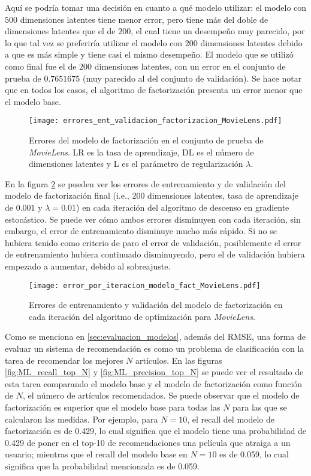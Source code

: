 Aquí se podría tomar una decisión en cuanto a qué modelo utilizar: el modelo con $500$ dimensiones latentes tiene menor error, pero tiene más del doble de dimensiones latentes que el de $200$, el cual tiene un desempeño muy parecido, por lo que tal vez se preferiría utilizar el modelo con $200$ dimensiones latentes debido a que es más simple y tiene casi el mismo desempeño. El modelo que se utilizó como final fue el de $200$ dimensiones latentes, con un error en el conjunto de prueba de $0.7651675$ (muy parecido al del conjunto de validación). Se hace notar que en todos los casos, el algoritmo de factorización presenta un error menor que el modelo base.

\begin{figure}[H]
	\centering
 	\texttt{[image: errores\_ent\_validacion\_factorizacion\_MovieLens.pdf]}
 	\caption{Errores del modelo de factorización en el conjunto de prueba de \textit{MovieLens}. LR es la tasa de aprendizaje, DL es el número de dimensiones latentes y L es el parámetro de regularización $\lambda$.}
 	\label{fig:ML_modelo_fact_errores}
\end{figure}

En la figura \ref{fig:ML_modelo_fact_error_por_iter} se pueden ver los errores de entrenamiento y de validación del modelo de factorización final (i.e., $200$ dimensiones latentes, tasa de aprendizaje de $0.001$ y $\lambda = 0.01$) en cada iteración del algoritmo de descenso en gradiente estocástico. Se puede ver cómo ambos errores disminuyen con cada iteración, sin embargo, el error de entrenamiento disminuye mucho más rápido. Si no se hubiera tenido como criterio de paro el error de validación, posiblemente el error de entrenamiento hubiera continuado disminuyendo, pero el de validación hubiera empezado a aumentar, debido al sobreajuste.


\begin{figure}[H]
	\centering
 	\texttt{[image: error\_por\_iteracion\_modelo\_fact\_MovieLens.pdf]}
 	\caption{Errores de entrenamiento y validación del modelo de factorización en cada iteración del algoritmo de optimización para \textit{MovieLens}.}
 	\label{fig:ML_modelo_fact_error_por_iter}
\end{figure}

Como se menciona en \ref{sec:evaluacion_modelos}, además del RMSE, una forma de evaluar un sistema de recomendación es como un problema de clasificación con la tarea de recomendar los mejores $N$ artículos. En las figuras \ref{fig:ML_recall_top_N} y \ref{fig:ML_precision_top_N} se puede ver el resultado de esta tarea comparando el modelo base y el modelo de factorización como función de $N$, el número de artículos recomendados. Se puede observar que el modelo de factorización es superior que el modelo base para todas las $N$ para las que se calcularon las medidas. Por ejemplo, para $N = 10$, el recall del modelo de factorización es de 0.429, lo cual significa que el modelo tiene una probabilidad de 0.429 de poner en el top-10 de recomendaciones una película que atraiga a un usuario; mientras que el recall del modelo base en $N = 10$ es de 0.059, lo cual significa que la probabilidad mencionada es de 0.059.

